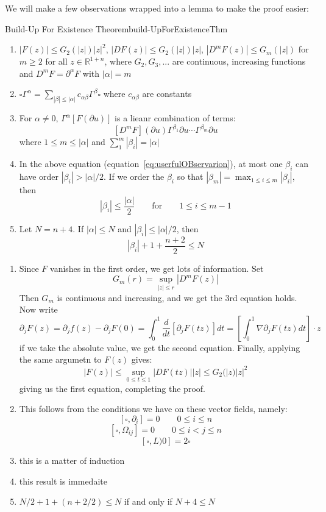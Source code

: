 \documentclass{book}
\newenvironment{Proof}[1][]
  {\begin{ProofTcb}[#1]}
  {\end{ProofTcb}}
\newcommand{\R}{{\mathbb{R}}}
\begin{document}
We will make a few observations wrapped into a lemma to make the proof easier:

\begin{lem}{Build-Up For Existence Theorem}{build-UpForExistenceThm}
	\begin{enumerate}
		\item $|F(z)| \le G_2(|z|)|z|^2$, $|DF(z)| \le G_2(|z|)|z|$, $|D^mF(z)| \le G_m(|z|)$ for $m
			\ge 2$ for all $z \in \R^{1+n}$, where $G_2, G_3, ...$ are continuous, increasing functions and
			$D^mF =  \partial^\alpha F$ with $|\alpha| = m$
		\item $\square \Gamma^\alpha = \sum_{|\beta| \le |\alpha|} c_{\alpha\beta}\Gamma^\beta \square$
			where $c_{\alpha\beta}$ are constants
		\item For $\alpha \ne 0$, $\Gamma^\alpha[F(  \partial u )]$ is a lieanr combination of terms:
			\begin{equation}\label{eq:userfulOBservarion}
			  [D^mF](  \partial u ) \Gamma^{\beta_1}  \partial u\cdots \Gamma^{\beta_m}  \partial u
			\end{equation}
			where $1 \le m \le |\alpha|$ and $\sum_1^m |\beta_i| = |\alpha|$
		\item In the above equation (equation~\ref{eq:userfulOBservarion}), at most one $\beta_i$ can
			have order $|\beta_i| > |\alpha|/2$. If we order the $\beta_i$ so that $|\beta_m| = \max_{1 \le
			i \le m} |\beta_i|$, then
			\[
				|\beta_i| \le \frac{|\alpha|}{2} \qquad \text{for} \qquad 1 \le i \le m-1
			\]
		\item Let $N = n+ 4$. If $|\alpha| \le N$ and $|\beta_i| \le |\alpha|/2$, then
			\[
				|\beta_i| + 1 + \frac{n+2}{2} \le N
			\]
	\end{enumerate}
\end{lem}

\begin{Proof}
	\begin{enumerate}
		\item Since $F$ vanishes in the first order, we get lots of information. Set
			\[
				G_m(r) = \sup_{|z| \le r} |D^mF(z)|
			\]
			Then $G_m$ is continuous and increasing, and we get the 3rd equation holds. Now write
			\[
				 \partial_j F(z) =  \partial_j f(z) -  \partial_jF(0) = \int_0^1 \frac{d}{dt} \left[  \partial_j F(tz)\right] dt = \left[ \int_0^1 \nabla  \partial_j F(tz)dt\right]\cdot z
			 \]
			 if we take the absolute value, we get the second equation. Finally, applying the same
			 argumetn to $F(z)$ gives:
			 \[
				 |F(z)| \le \sup_{0 \le t \le 1} |DF(tz)||z| \le G_2(|z)|z|^2
			 \]
			 giving us the first equation, completing the proof.
		 \item This follows from the conditions we have on these vector fields, namely:
			 \[
				 [\square,  \partial_i] = 0 \qquad 0 \le i \le n
			 \]
			 \[
				 [\square,  \Omega_{ij}] = 0 \qquad 0 \le i < j \le n
			 \]
			 \[
				 [\square,  L)0] = 2\square
			 \]
		 \item this is a matter of induction
		 \item this result is immedaite
		 \item $N/2+1+(n+2/2) \le N$ if and only if $N+4 \le N$
	\end{enumerate}
\end{Proof}
\end{document}
